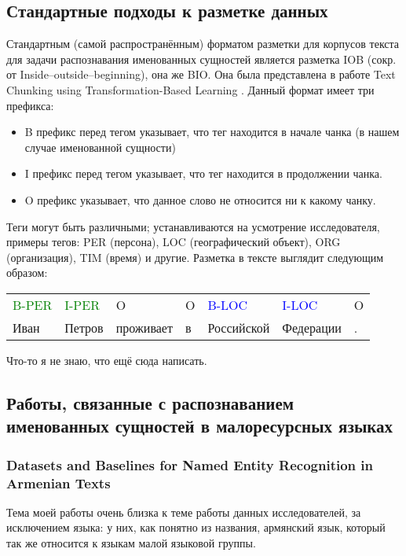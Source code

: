 \subsection{Стандартные подходы к разметке данных}

Стандартным (самой распространённым) форматом разметки для корпусов текста для задачи распознавания именованных сущностей является разметка IOB (сокр. от Inside–outside–beginning), она же BIO. Она была представлена в работе Text Chunking using Transformation-Based Learning \cite{DBLP:journals/corr/cmp-lg-9505040}. Данный формат имеет три префикса:
\begin{itemize}
\item B префикс перед тегом указывает, что тег находится в начале чанка (в нашем случае именованной сущности)
\item I префикс перед тегом указывает, что тег находится в продолжении чанка.
\item O префикс указывает, что данное слово не относится ни к какому чанку. 
\end{itemize}
 
Теги могут быть различными; устанавливаются на усмотрение исследователя, примеры тегов: PER (персона), LOC (географический объект), ORG (организация), TIM (время) и другие. Разметка в тексте выглядит следующим образом:

\begin{tabular}[h]{lllllll}
\textcolor{green}{B-PER} & \textcolor{green}{I-PER} & O & O & \textcolor{blue}{B-LOC} &  \textcolor{blue}{I-LOC} & O \\
Иван & Петров & проживает & в & Российской & Федерации & . \\
\end{tabular}

Что-то я не знаю, что ещё сюда написать.

\subsection{Работы, связанные с распознаванием именованных сущностей в малоресурсных языках}

\subsubsection{Datasets and Baselines for Named Entity Recognition in Armenian Texts}

Тема моей работы очень близка к теме работы данных исследователей, за исключением языка: у них, как понятно из названия, армянский язык, который так же относится к языкам малой языковой группы.

